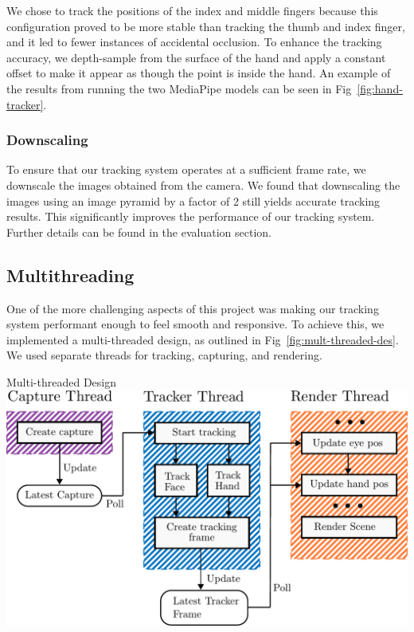 We chose to track the positions of the index and middle fingers because this configuration proved to be more stable than tracking the thumb and index finger, and it led to fewer instances of accidental occlusion. To enhance the tracking accuracy, we depth-sample from the surface of the hand and apply a constant offset to make it appear as though the point is inside the hand. An example of the results from running the two MediaPipe models can be seen in Fig~\ref{fig:hand-tracker}.

\subsubsection*{Downscaling}
To ensure that our tracking system operates at a sufficient frame rate, we downscale the images obtained from the camera. We found that downscaling the images using an image pyramid \cite{adelson1984pmi} by a factor of 2 still yields accurate tracking results. This significantly improves the performance of our tracking system. Further details can be found in the evaluation section.


\subsection{Multithreading}

One of the more challenging aspects of this project was making our tracking system performant enough to feel smooth and responsive. To achieve this, we implemented a multi-threaded design, as outlined in Fig~\ref{fig:mult-threaded-des}. We used separate threads for tracking, capturing, and rendering.

\begin{figureBox}[label={fig:mult-threaded-des}, width=0.8\linewidth]{Multi-threaded Design}
    \includegraphics[width=1.0\linewidth]{./implementation/figures/multi-thread-design.pdf}
\end{figureBox}

